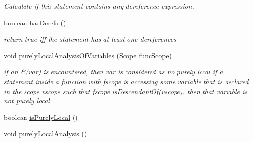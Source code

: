 \begin{DoxyCompactItemize}
\begin{DoxyCompactList}\small\item\em Calculate if this statement contains any dereference expression. \end{DoxyCompactList}\item 
boolean \hyperlink{classedu_1_1udel_1_1cis_1_1vsl_1_1civl_1_1model_1_1common_1_1statement_1_1CommonStatement_a542858551fd806e59221e80555d4473e}{has\+Derefs} ()
\begin{DoxyCompactList}\small\item\em return true iff the statement has at least one dereferences \end{DoxyCompactList}\item 
void \hyperlink{classedu_1_1udel_1_1cis_1_1vsl_1_1civl_1_1model_1_1common_1_1statement_1_1CommonStatement_a5d9014e6ab63bf4e8f834671afa349bb}{purely\+Local\+Analysis\+Of\+Variables} (\hyperlink{interfaceedu_1_1udel_1_1cis_1_1vsl_1_1civl_1_1model_1_1IF_1_1Scope}{Scope} func\+Scope)
\begin{DoxyCompactList}\small\item\em if an \&(var) is encountered, then var is considered as no purely local if a statement inside a function with fscope is accessing some variable that is declared in the scope vscope such that fscope.\+is\+Descendant\+Of(vscope), then that variable is not purely local \end{DoxyCompactList}\item 
boolean \hyperlink{classedu_1_1udel_1_1cis_1_1vsl_1_1civl_1_1model_1_1common_1_1statement_1_1CommonStatement_a3e58815500c3246aa59b1a4f7591e666}{is\+Purely\+Local} ()
\item 
\hypertarget{classedu_1_1udel_1_1cis_1_1vsl_1_1civl_1_1model_1_1common_1_1statement_1_1CommonStatement_acc62024ed4778df4219d3b3286faed4d}{}void \hyperlink{classedu_1_1udel_1_1cis_1_1vsl_1_1civl_1_1model_1_1common_1_1statement_1_1CommonStatement_acc62024ed4778df4219d3b3286faed4d}{purely\+Local\+Analysis} ()\label{classedu_1_1udel_1_1cis_1_1vsl_1_1civl_1_1model_1_1common_1_1statement_1_1CommonStatement_acc62024ed4778df4219d3b3286faed4d}


\end{DoxyCompactItemize}
